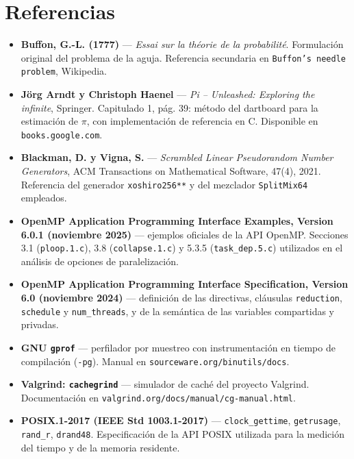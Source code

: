 \section{Referencias}

\begin{itemize}
    \item \textbf{Buffon, G.-L. (1777)} --- \textit{Essai sur la théorie de la probabilité}. Formulación original del problema de la aguja. Referencia secundaria en \texttt{Buffon's needle problem}, Wikipedia.

    \item \textbf{Jörg Arndt y Christoph Haenel} --- \textit{Pi -- Unleashed: Exploring the infinite}, Springer. Capitulado 1, pág. 39: método del dartboard para la estimación de $\pi$, con implementación de referencia en C. Disponible en \texttt{books.google.com}.

    \item \textbf{Blackman, D. y Vigna, S.} --- \textit{Scrambled Linear Pseudorandom Number Generators}, ACM Transactions on Mathematical Software, 47(4), 2021. Referencia del generador \texttt{xoshiro256**} y del mezclador \texttt{SplitMix64} empleados.

    \item \textbf{OpenMP Application Programming Interface Examples, Version 6.0.1 (noviembre 2025)} --- ejemplos oficiales de la API OpenMP. Secciones 3.1 (\texttt{ploop.1.c}), 3.8 (\texttt{collapse.1.c}) y 5.3.5 (\texttt{task\_dep.5.c}) utilizados en el análisis de opciones de paralelización.

    \item \textbf{OpenMP Application Programming Interface Specification, Version 6.0 (noviembre 2024)} --- definición de las directivas, cláusulas \texttt{reduction}, \texttt{schedule} y \texttt{num\_threads}, y de la semántica de las variables compartidas y privadas.

    \item \textbf{GNU \texttt{gprof}} --- perfilador por muestreo con instrumentación en tiempo de compilación (\texttt{-pg}). Manual en \texttt{sourceware.org/binutils/docs}.

    \item \textbf{Valgrind: \texttt{cachegrind}} --- simulador de caché del proyecto Valgrind. Documentación en \texttt{valgrind.org/docs/manual/cg-manual.html}.

    \item \textbf{POSIX.1-2017 (IEEE Std 1003.1-2017)} --- \texttt{clock\_gettime}, \texttt{getrusage}, \texttt{rand\_r}, \texttt{drand48}. Especificación de la API POSIX utilizada para la medición del tiempo y de la memoria residente.


\end{itemize}
